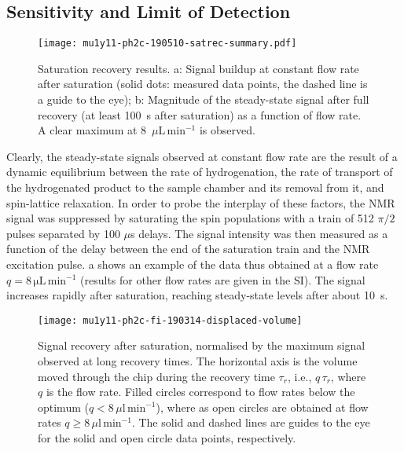 \subsection{Sensitivity and Limit of Detection}

\begin{figure}
	\centering
	\texttt{[image: mu1y11-ph2c-190510-satrec-summary.pdf]}
	\caption{Saturation recovery results.
  a: Signal buildup at constant
	flow rate after saturation (solid dots: measured data points,
  the dashed line is a guide to the eye);
	b: Magnitude of the steady-state signal after full recovery (at least
	100~s after saturation) as a function of flow rate. A clear maximum
	at 8~$\mu\mathrm{L}\,\text{min}^{-1}$ is observed.}
	\label{fig:satrec-summary}
\end{figure}


Clearly, the steady-state signals observed at constant flow rate are the result
of a dynamic equilibrium between the rate of hydrogenation, the rate of
transport of the hydrogenated product to the sample chamber and its removal
from it, and spin-lattice relaxation. In order to probe the interplay of these
factors, the NMR signal was suppressed by saturating the spin populations
with a train of 512 $\pi/2$ pulses separated by 100 $\mu$s delays.
The signal intensity was then measured as a function of the delay between the
end of the saturation train and the NMR excitation pulse.
a shows an example of the data thus obtained at a
flow rate $q=8\,\mathrm{\mu L\,\text{min}^{-1}}$ (results for
other flow rates are given in the SI).
The signal increases rapidly after saturation, reaching
steady-state levels after about 10~s.

\begin{figure}
  \begin{center}
  \texttt{[image: mu1y11-ph2c-fi-190314-displaced-volume]}
  \end{center}
  \caption{Signal recovery after saturation, normalised by the maximum signal
  observed at long recovery times. The horizontal axis is the volume
  moved through the chip during the recovery time $\tau_r$, i.e., $q\,\tau_r$,
  where $q$ is the flow rate. Filled circles correspond to flow rates below
  the optimum ($q<8\,\mu\mathrm{l}\,\text{min}^{-1}$), where as open circles
  are obtained at flow rates $q\ge 8\,\mu\mathrm{l}\,\text{min}^{-1}$. The solid
  and dashed lines are guides to the eye for the solid and open circle data points,
  respectively.}
  \label{fig:displaced-volume}
\end{figure}

